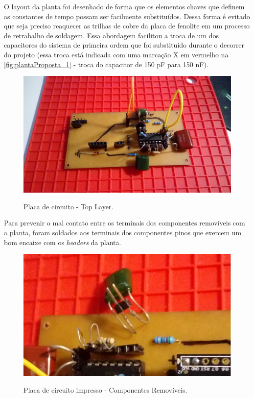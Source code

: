 \documentclass[
	article,			%
	11pt,				%
	oneside,			%
	a4paper,			%
	english,			%
	brazil,				%
	sumario=tradicional
	]{abntex2}
\begin{document}
\pagebreak

O layout da planta foi desenhado de forma que os elementos chaves que definem as constantes de tempo possam ser facilmente substituídos. 
Dessa forma é evitado que seja preciso reaquecer as trilhas de cobre da placa de fenolite em um processo de retrabalho de soldagem.
Essa abordagem facilitou a troca de um dos capacitores do sistema de primeira ordem que foi substituído durante o decorrer do projeto (essa troca está indicada com uma marcação X em vermelho na \autoref{fig:plantaProposta_1} - troca do capacitor de 150 pF para 150 nF). 

\begin{figure}[htb!]
	\centering
	\caption{Placa de circuito - Top Layer.}
	\includegraphics[scale=0.23]{./img/plantaMontagem_2.jpg}
	\label{fig:plantaMontagem_2}
\end{figure}

Para prevenir o mal contato entre os terminais dos componentes removíveis com a planta, foram soldados aos terminais dos componentes pinos que exercem um bom encaixe com os \textit{headers} da planta.
\begin{figure}[htb!]
	\centering
	\caption{Placa de circuito impresso - Componentes Removíveis.}
	\includegraphics[scale=0.7]{./img/plantaMontagem_3.jpg}
	\label{fig:plantaMontagem_3}
\end{figure}
\end{document}
